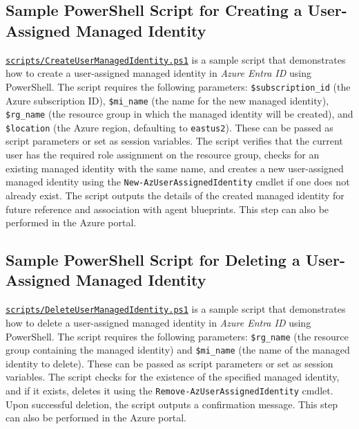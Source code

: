 \documentclass[9pt]{extarticle}%
\begin{document}
\subsection{Sample PowerShell Script for Creating a User-Assigned Managed Identity}%
\href{https://github.com/dennisseah/agent-identity/blob/main/scripts/CreateUserManagedIdentity.ps1}{\texttt{scripts/CreateUserManagedIdentity.ps1}} is a sample script that demonstrates how to create a user-assigned managed identity in \textit{Azure Entra ID} using PowerShell. The script requires the following parameters: \texttt{\$subscription\_id} (the Azure subscription ID), \texttt{\$mi\_name} (the name for the new managed identity), \texttt{\$rg\_name} (the resource group in which the managed identity will be created), and \texttt{\$location} (the Azure region, defaulting to \texttt{eastus2}). These can be passed as script parameters or set as session variables. The script verifies that the current user has the required role assignment on the resource group, checks for an existing managed identity with the same name, and creates a new user-assigned managed identity using the \texttt{New-AzUserAssignedIdentity} cmdlet if one does not already exist. The script outputs the details of the created managed identity for future reference and association with agent blueprints. This step can also be performed in the Azure portal.
%
\par\vspace{\baselineskip}%
\subsection{Sample PowerShell Script for Deleting a User-Assigned Managed Identity}%
\href{https://github.com/dennisseah/agent-identity/blob/main/scripts/DeleteUserManagedIdentity.ps1}{\texttt{scripts/DeleteUserManagedIdentity.ps1}} is a sample script that demonstrates how to delete a user-assigned managed identity in \textit{Azure Entra ID} using PowerShell. The script requires the following parameters: \texttt{\$rg\_name} (the resource group containing the managed identity) and \texttt{\$mi\_name} (the name of the managed identity to delete). These can be passed as script parameters or set as session variables. The script checks for the existence of the specified managed identity, and if it exists, deletes it using the \texttt{Remove-AzUserAssignedIdentity} cmdlet. Upon successful deletion, the script outputs a confirmation message. This step can also be performed in the Azure portal.
%
\par\vspace{\baselineskip}%
\end{document}
